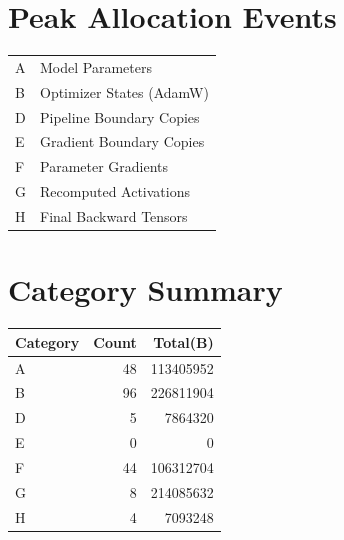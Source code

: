 \documentclass{article}
\begin{document}
\section*{Peak Allocation Events}
\small
\begin{tabular}{ll}
A & Model Parameters \\
B & Optimizer States (AdamW) \\
D & Pipeline Boundary Copies \\
E & Gradient Boundary Copies \\
F & Parameter Gradients \\
G & Recomputed Activations \\
H & Final Backward Tensors \\
\end{tabular}
\vspace{0.5em}
\section*{Category Summary}
\begin{tabular}{l r r}
Category & Count & Total(B) \\
\hline
A & 48 & 113405952 \\
B & 96 & 226811904 \\
D & 5 & 7864320 \\
E & 0 & 0 \\
F & 44 & 106312704 \\
G & 8 & 214085632 \\
H & 4 & 7093248 \\
\end{tabular}
\vspace{0.5em}
\end{document}
